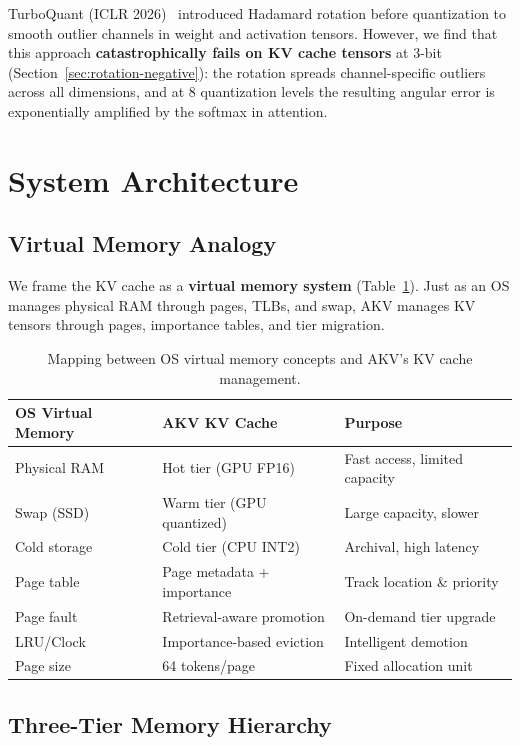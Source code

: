 \documentclass[11pt,a4paper]{article}
\begin{document}
TurboQuant (ICLR 2026)~\cite{turboquant} introduced Hadamard rotation before quantization to smooth outlier channels in weight and activation tensors. However, we find that this approach \textbf{catastrophically fails on KV cache tensors} at 3-bit (Section~\ref{sec:rotation-negative}): the rotation spreads channel-specific outliers across all dimensions, and at 8 quantization levels the resulting angular error is exponentially amplified by the softmax in attention.

\section{System Architecture}

\subsection{Virtual Memory Analogy}

We frame the KV cache as a \textbf{virtual memory system} (Table~\ref{tab:analogy}). Just as an OS manages physical RAM through pages, TLBs, and swap, AKV manages KV tensors through pages, importance tables, and tier migration.

\begin{table}[h]
\centering
\begin{tabular}{lll}
\toprule
\textbf{OS Virtual Memory} & \textbf{AKV KV Cache} & \textbf{Purpose} \\
\midrule
Physical RAM & Hot tier (GPU FP16) & Fast access, limited capacity \\
Swap (SSD) & Warm tier (GPU quantized) & Large capacity, slower \\
Cold storage & Cold tier (CPU INT2) & Archival, high latency \\
Page table & Page metadata + importance & Track location \& priority \\
Page fault & Retrieval-aware promotion & On-demand tier upgrade \\
LRU/Clock & Importance-based eviction & Intelligent demotion \\
Page size & 64 tokens/page & Fixed allocation unit \\
\bottomrule
\end{tabular}
\caption{Mapping between OS virtual memory concepts and AKV's KV cache management.}
\label{tab:analogy}
\end{table}

\subsection{Three-Tier Memory Hierarchy}
\end{document}
